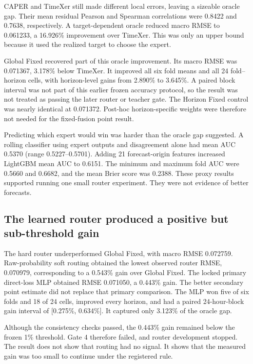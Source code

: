 

CAPER and TimeXer still made different local errors, leaving a sizeable oracle gap.  Their mean residual Pearson and Spearman correlations were 0.8422 and 0.7638, respectively.  A target-dependent oracle reduced macro RMSE to 0.061233, a 16.926\% improvement over TimeXer.  This was only an upper bound because it used the realized target to choose the expert.

Global Fixed recovered part of this oracle improvement.  Its macro RMSE was 0.071367, 3.178\% below TimeXer.  It improved all six fold means and all 24 fold--horizon cells, with horizon-level gains from 2.890\% to 3.645\%.  A paired block interval was not part of this earlier frozen accuracy protocol, so the result was not treated as passing the later router or teacher gate.  The Horizon Fixed control was nearly identical at 0.071372.  Post-hoc horizon-specific weights were therefore not needed for the fixed-fusion point result.

Predicting which expert would win was harder than the oracle gap suggested.  A rolling classifier using expert outputs and disagreement alone had mean AUC 0.5370 (range 0.5227--0.5701).  Adding 21 forecast-origin features increased LightGBM mean AUC to 0.6151.  The minimum and maximum fold AUC were 0.5660 and 0.6682, and the mean Brier score was 0.2388.  These proxy results supported running one small router experiment.  They were not evidence of better forecasts.

\subsection{The learned router produced a positive but sub-threshold gain}
\label{sec:results-router}

The hard router underperformed Global Fixed, with macro RMSE 0.072759.  Raw-probability soft routing obtained the lowest observed router RMSE, 0.070979, corresponding to a 0.543\% gain over Global Fixed.  The locked primary direct-loss MLP obtained RMSE 0.071050, a 0.443\% gain.  The better secondary point estimate did not replace that primary comparison.  The MLP won five of six folds and 18 of 24 cells, improved every horizon, and had a paired 24-hour-block gain interval of [0.275\%, 0.634\%].  It captured only 3.123\% of the oracle gap.

Although the consistency checks passed, the 0.443\% gain remained below the frozen 1\% threshold.  Gate 4 therefore failed, and router development stopped.  The result does not show that routing had no signal.  It shows that the measured gain was too small to continue under the registered rule.

